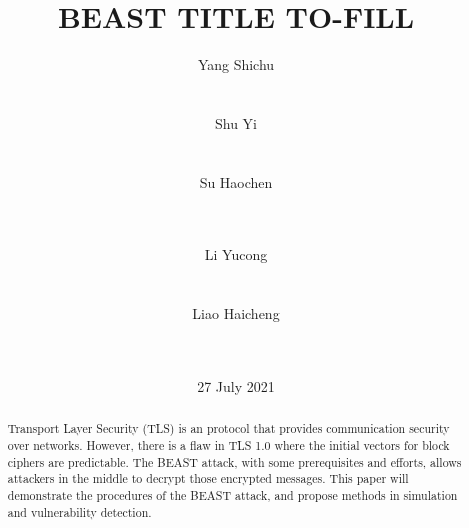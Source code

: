 \documentclass{acm_proc_article-sp}
\begin{document}
\title{
BEAST TITLE TO-FILL
}
\author{
\alignauthor
Yang Shichu\\
       \\
       \\
\alignauthor
Shu Yi\\
       \\
       \\
\alignauthor
Su Haochen\\
       \\
       \\
\and
\alignauthor
Li Yucong\\
       \\
       \\
\alignauthor
Liao Haicheng\\
       \\
       \\
}
\date{27 July 2021}
\maketitle
\begin{abstract}
Transport Layer Security (TLS) is an protocol that provides communication
security over networks. However, there is a flaw in TLS 1.0 where the initial
vectors for block ciphers are predictable. The BEAST attack, with some
prerequisites and efforts, allows attackers in the middle to decrypt those
encrypted messages.
This paper will demonstrate the procedures of the BEAST attack, and propose
methods in simulation and vulnerability detection.
\end{abstract}


\end{document}
